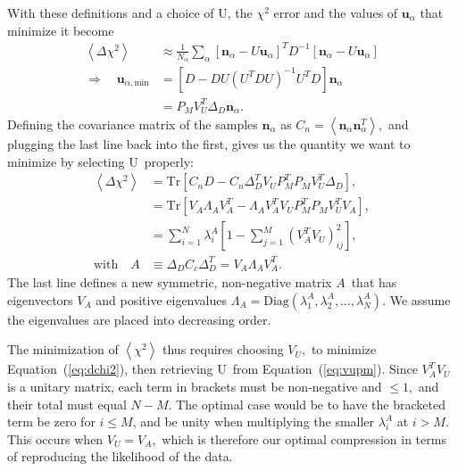 \documentclass[linenumbers, onecolumn]{aastex63}
\newcommand{\eqq}[1]{Equation~(\ref{#1})}
\newcommand{\vecn}{\ensuremath{\mathbf{n}}}
\newcommand{\vecu}{\ensuremath{\mathbf{u}}}
\newcommand{\covm}{C}
\newcommand{\matA}{\ensuremath{A}}
\newcommand{\matD}{D}
\newcommand{\matU}{U}
\newcommand{\matV}{V}
\newcommand{\proj}{P}  %
\newcommand{\DD}{\Delta_D}
\newcommand{\trace}{\text{Tr}}
\begin{document}
With these definitions and a choice of \matU, the $\chi^2$ error and the values of $\vecu_\alpha$ that minimize it become
\begin{align}
  \left\langle \Delta\chi^2 \right\rangle & \approx \frac{1}{N_\alpha} \sum_\alpha
                                            \left[ \vecn_\alpha - \matU \vecu_\alpha\right]^T \matD^{-1}
                                            \left[ \vecn_\alpha - \matU \vecu_\alpha\right] \\
  \Rightarrow \quad \vecu_{\alpha,\text{min}} & = \left[ \matD -
                                                \matD\matU\left(\matU^{T}\matD\matU\right)^{-1}
                                                \matU^T\matD\right]\vecn_\alpha  \\
                                          & = \proj_M \matV_U^T \DD \vecn_\alpha.
\end{align}                                            
Defining the covariance matrix of the samples $\vecn_\alpha$ as
$\covm_n=\left\langle \vecn_\alpha \vecn^T_\alpha \right\rangle,$ and
plugging the last line back into the first,  gives us the quantity we
want to minimize by selecting \matU\ properly:
\begin{align}
  \left\langle \Delta \chi^2 \right\rangle 
  & = \trace\left[\covm_n\matD
    - \covm_n \DD^T \matV_U \proj_M^T \proj_M \matV_U^T \DD \right], \\
 & = \trace\left[\matV_A \Lambda_A \matV_A^T 
    - \Lambda_A  \matV_A^T \matV_U \proj_M^T \proj_M \matV_U^T
   \matV_A\right], \\
  & = \sum_{i=1}^N \lambda^A_i \left[ 1 - \sum_{j=1}^M (\matV^T_A
    \matV_U)^2_{ij}\right], \label{eq:dchi2} \\
  \text{with} \quad \matA & \equiv \DD \covm_c \DD^T = \matV_A \Lambda_A \matV_A^T.
\end{align}
The last line defines a new symmetric, non-negative matrix \matA\ that
has eigenvectors $\matV_A$ and positive eigenvalues $\Lambda_A=\text{Diag}(\lambda^A_1,
\lambda^A_2, \ldots, \lambda^A_N).$ We assume the eigenvalues are
placed into decreasing order.

The minimization of $\left\langle \chi^2 \right\rangle$ thus requires
choosing $\matV_U,$ to minimize \eqq{eq:dchi2}, then retrieving \matU\
from \eqq{eq:vupm}.  Since $\matV_A^T\matV_U$ is a unitary matrix,
each term in brackets must be non-negative and $\le 1,$ and their total must equal
$N-M$.  The optimal case would be to have the bracketed term be zero
for $i\le M$, and be unity when multiplying the smaller $\lambda^A_i$
at $i>M.$  This occurs when $\matV_U=\matV_A,$ which is therefore our
optimal compression in terms of reproducing the likelihood of the
data.
\end{document}
